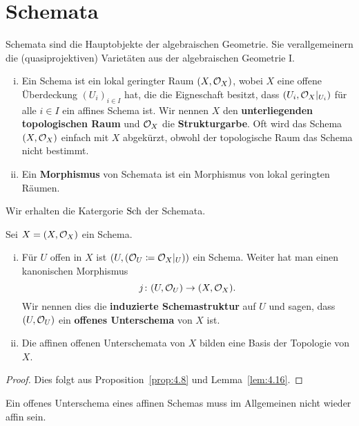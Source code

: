 
\chapter{Schemata}

Schemata sind die Hauptobjekte der algebraischen Geometrie. Sie verallgemeinern die (quasiprojektiven) Varietäten aus der algebraischen Geometrie I.

\begin{defn}
\label{defn:5.1}
	\begin{enumerate}[i)]
		\item Ein Schema ist ein lokal geringter Raum $(X,\mathcal{O}_X)$, wobei $X$ eine offene Überdeckung $(U_i)_{i\in I}$ hat, die die Eigneschaft besitzt, dass $(U_i,\mathcal{O}_{X}\vert_{U_i})$ für alle $i \in I$ ein affines Schema ist. Wir nennen $X$ den \textbf{unterliegenden topologischen Raum} und $\mathcal{O}_X$ die \textbf{Strukturgarbe}. Oft wird das Schema $(X,\mathcal{O}_X)$ einfach mit $X$ abgekürzt, obwohl der topologische Raum das Schema nicht bestimmt.
		\item Ein \textbf{Morphismus} von Schemata ist ein Morphismus von lokal geringten Räumen.
	\end{enumerate}
	Wir erhalten die Katergorie $\operatorname{Sch}$ der Schemata.
\end{defn}

\begin{prop}
	Sei $X = (X,\mathcal{O}_X)$ ein Schema.
	\begin{enumerate}[i)]
		\item Für $U$ offen in $X$ ist $(U,(\mathcal{O}_U \coloneqq \mathcal{O}_X\vert_U))$ ein Schema. Weiter hat man einen kanonischen Morphismus
		\[
			j\colon (U,\mathcal{O}_U) \to (X,\mathcal{O}_X).
		\]
		Wir nennen dies die \textbf{induzierte Schemastruktur} auf $U$ und sagen, dass $(U,\mathcal{O}_U)$ ein \textbf{offenes Unterschema} von $X$ ist.
		\item Die affinen offenen Unterschemata von $X$ bilden eine Basis der Topologie von $X$.
	\end{enumerate}
	\begin{proof}
		Dies folgt aus Proposition~\ref{prop:4.8} und Lemma~\ref{lem:4.16}.
	\end{proof}
\end{prop}

\begin{bem}
	Ein offenes Unterschema eines affinen Schemas muss im Allgemeinen nicht wieder affin sein.
\end{bem}

